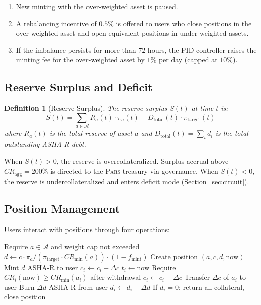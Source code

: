 \documentclass[11pt,a4paper]{article}
\newcommand{\Pars}{\textsc{Pars}\xspace}
\newcommand{\ashares}{\textsc{ASHA-R}\xspace}
\newcommand{\CR}{\mathit{CR}}
\newtheorem{definition}{Definition}
\begin{document}
\begin{enumerate}
  \item New minting with the over-weighted asset is paused.
  \item A rebalancing incentive of $0.5\%$ is offered to users who close positions in the over-weighted asset and open equivalent positions in under-weighted assets.
  \item If the imbalance persists for more than $72$ hours, the PID controller raises the minting fee for the over-weighted asset by $1\%$ per day (capped at $10\%$).
\end{enumerate}

\subsection{Reserve Surplus and Deficit}

\begin{definition}[Reserve Surplus]
The reserve surplus $S(t)$ at time $t$ is:
\begin{equation}
  S(t) = \sum_{a \in \mathcal{A}} R_a(t) \cdot \pi_a(t) - D_{\text{total}}(t) \cdot \pi_{\text{target}}(t)
\end{equation}
where $R_a(t)$ is the total reserve of asset $a$ and $D_{\text{total}}(t) = \sum_i d_i$ is the total outstanding \ashares debt.
\end{definition}

When $S(t) > 0$, the reserve is overcollateralized.
Surplus accrual above $\CR_{\text{agg}} = 200\%$ is directed to the \Pars treasury via governance.
When $S(t) < 0$, the reserve is undercollateralized and enters deficit mode (Section~\ref{sec:circuit}).

\subsection{Position Management}

Users interact with positions through four operations:

\begin{algorithm}[H]
\caption{Position Operations}
\label{alg:position}
\begin{algorithmic}[1]
  \State Require $a \in \mathcal{A}$ and weight cap not exceeded
  \State $d \gets c \cdot \pi_a / (\pi_{\text{target}} \cdot \CR_{\min}(a)) \cdot (1 - f_{\text{mint}})$
  \State Create position $(a, c, d, \text{now})$
  \State Mint $d$ \ashares to user
\EndProcedure
\Statex
{}
  \State $c_i \gets c_i + \Delta c$
  \State $t_i \gets \text{now}$
\EndProcedure
\Statex
{}
  \State Require $\CR_i(\text{now}) \geq \CR_{\min}(a_i)$ after withdrawal
  \State $c_i \gets c_i - \Delta c$
  \State Transfer $\Delta c$ of $a_i$ to user
\EndProcedure
\Statex
\Procedure{Repay}{position $P_i$, \ashares amount $\Delta d$}
  \State Burn $\Delta d$ \ashares from user
  \State $d_i \gets d_i - \Delta d$
  \State If $d_i = 0$: return all collateral, close position
\EndProcedure
\end{algorithmic}
\end{algorithm}
\end{document}
